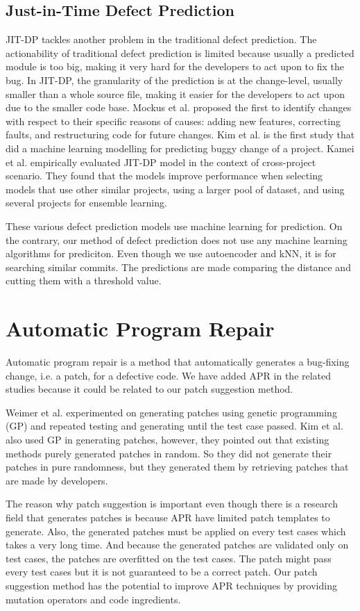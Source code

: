 \subsection{Just-in-Time Defect Prediction}
JIT-DP tackles another problem in the traditional defect prediction.
The actionability of traditional defect prediction is limited because usually a predicted module is too big, making it very hard for the developers to act upon to fix the bug.
In JIT-DP, the granularity of the prediction is at the change-level, usually smaller than a whole source file, making it easier for the developers to act upon due to the smaller code base.
Mockus et al. \cite{mockus2000identifying} proposed the first to identify changes with respect to their specific reasons of causes: adding new features, correcting faults, and restructuring code for future changes.
Kim et al. \cite{kim2008classifying} is the first study that did a machine learning modelling for predicting buggy change of a project.
Kamei et al. \cite{kamei2016studying} empirically evaluated  JIT-DP model in the context of cross-project scenario.
They found that the models improve performance when selecting models that use other similar projects, using a larger pool of dataset, and using several projects for ensemble learning.  

These various defect prediction models use machine learning for prediction.
On the contrary, our method of defect prediction does not use any machine learning algorithms for prediciton.
Even though we use autoencoder and kNN, it is for searching similar commits.
The predictions are made comparing the distance and cutting them with a threshold value.

\section{Automatic Program Repair}
Automatic program repair is a method that automatically generates a bug-fixing change, i.e. a patch, for a defective code.
We have added APR in the related studies because it could be related to our  patch suggestion method.

Weimer et al. \cite{weimer2009automatically} experimented on generating patches using genetic programming (GP) and repeated testing and generating until the test case passed. 
Kim et al. \cite{kim2013automatic} also used GP in generating patches, however, they pointed out that existing methods purely generated patches in random. 
So they did not generate their patches in pure randomness, but they generated them by retrieving patches that are made by developers. 

The reason why patch suggestion is important even though there is a research field that generates patches is because APR have limited patch templates to generate.
Also, the generated patches must be applied on every test cases which takes a very long time.
And because the generated patches are validated only on test cases, the patches are overfitted on the test cases.
The patch might pass every test cases but it is not guaranteed to be a correct patch.
Our patch suggestion method has the potential to improve APR techniques by providing mutation operators and code ingredients.

